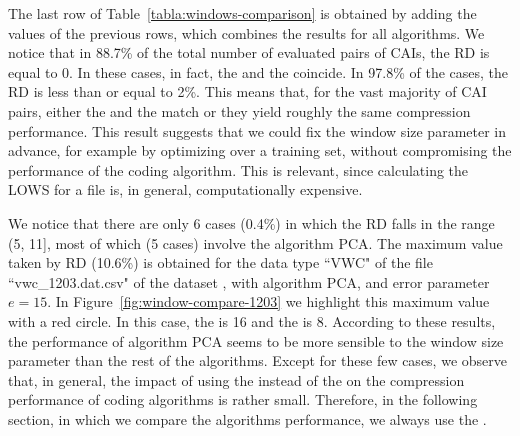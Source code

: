 The last row of Table~\ref{tabla:windows-comparison} is obtained by adding the values of the previous rows, which combines the results for all algorithms. We notice that in 88.7\% of the total number of evaluated pairs of CAIs, the RD is equal to 0. In these cases, in fact, the \ows and the \lows coincide. In 97.8\% of the cases, the RD is less than or equal to 2\%. This means that, for the vast majority of CAI pairs, either the \ows and the \lows match or they yield roughly the same compression performance. This result suggests that we could fix the window size parameter in advance, for example by optimizing over a training set, without compromising the performance of the coding algorithm. This is relevant, since calculating the LOWS for a file is, in general, computationally expensive.


We notice that there are only 6 cases (0.4\%) in which the RD falls in the range (5, 11], most of which (5 cases) involve the algorithm PCA. The maximum value taken by RD (10.6\%) is obtained for the data type ``VWC" of the file ``vwc\_1203.dat.csv" of the dataset \datasetsst, with algorithm PCA, and error parameter $e=15$. In Figure~\ref{fig:window-compare-1203} we highlight this maximum value with a red circle. In this case, the \ows is 16 and the \lows is 8. According to these results, the performance of algorithm PCA seems to be more sensible to the window size parameter than the rest of the algorithms. Except for these few cases, we observe that, in general, the impact of using the \ows instead of the \lows on the compression performance of coding algorithms is rather small. Therefore, in the following section, in which we compare the algorithms performance, we always use the \owsns.


\clearpage

